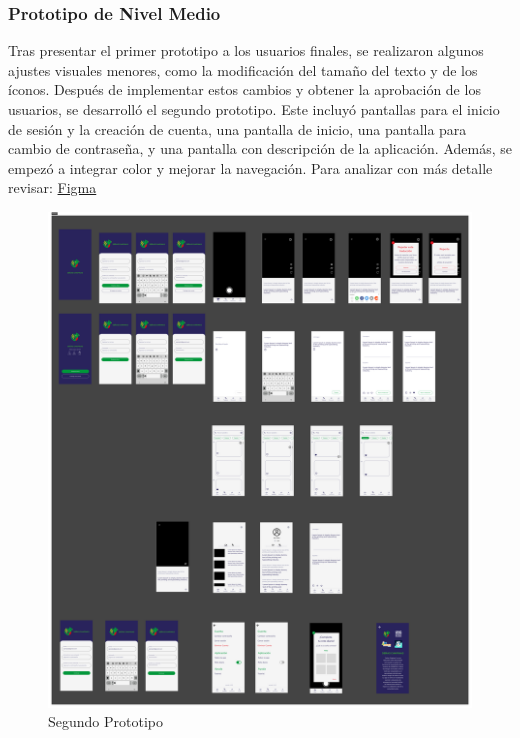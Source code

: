 \subsubsection{Prototipo de Nivel Medio}

Tras presentar el primer prototipo a los usuarios finales, se realizaron algunos ajustes visuales menores, como la modificación del tamaño del texto y de los íconos. Después de implementar estos cambios y obtener la aprobación de los usuarios, se desarrolló el segundo prototipo. Este incluyó pantallas para el inicio de sesión y la creación de cuenta, una pantalla de inicio, una pantalla para cambio de contraseña, y una pantalla con descripción de la aplicación. Además, se empezó a integrar color y mejorar la navegación. Para analizar con más detalle revisar: \href{https://www.figma.com/design/d7NOw36r1mUY7qDBIveJ2K/Se%C3%B1as-Chapinas?node-id=275-15737&node-type=CANVAS&t=ua1wEji5yxVRI6ES-0}{Figma} 


\begin{figure} [H]
    \centering
    \includegraphics[width=1\linewidth]{figuras/segundo_prototipo.png}
    \caption{Segundo Prototipo}
    \label{fig:segundo_prototipo}
\end{figure}

